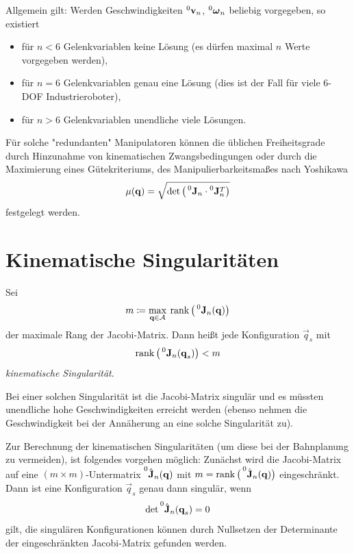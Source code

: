 		Allgemein gilt: Werden Geschwindigkeiten \( \prescript{0}{}{\boldsymbol{\mathrm{v}}}_n \), \( \prescript{0}{}{\boldsymbol{\mathrm{\omega}}}_n \) beliebig vorgegeben, so existiert
		\begin{itemize}
			\item für \( n < 6 \) Gelenkvariablen \iA keine Lösung (es dürfen maximal \(n\) Werte vorgegeben werden),
			\item für \( n = 6 \) Gelenkvariablen \iA genau eine Lösung (dies ist der Fall für viele \num{6}-DOF Industrieroboter),
			\item für \( n > 6 \) Gelenkvariablen \iA unendliche viele Lösungen.
		\end{itemize}
		Für solche "redundanten" Manipulatoren können die üblichen Freiheitsgrade \zB durch Hinzunahme von kinematischen Zwangsbedingungen oder durch die Maximierung eines Gütekriteriums, \zB des Manipulierbarkeitsmaßes nach Yoshikawa
		\begin{equation*}
			\mu(\boldsymbol{\mathrm{q}}) = \sqrt{\det \big( \prescript{0}{}{\boldsymbol{\mathrm{J}}}_n \cdot \prescript{0}{}{\boldsymbol{\mathrm{J}}}_n^T \big)}
		\end{equation*}
		festgelegt werden.

	\section{Kinematische Singularitäten}
		Sei
		\begin{equation*}
			m \coloneqq \max_{\boldsymbol{\mathrm{q}} \in \mathcal{A}} \> \rank\big(\prescript{0}{}{\boldsymbol{\mathrm{J}}}_n(\boldsymbol{\mathrm{q}})\big)
		\end{equation*}
		der maximale Rang der Jacobi-Matrix. Dann heißt jede Konfiguration \(\vec{q}_s\) mit
		\begin{equation*}
			\rank\big(\prescript{0}{}{\boldsymbol{\mathrm{J}}}_n(\boldsymbol{\mathrm{q}}_s)\big) < m
		\end{equation*}
		\emph{kinematische Singularität}.
		
		Bei einer solchen Singularität ist die Jacobi-Matrix singulär und es müssten unendliche hohe Geschwindigkeiten erreicht werden (ebenso nehmen die Geschwindigkeit bei der Annäherung an eine solche Singularität \iA zu).
		
		Zur Berechnung der kinematischen Singularitäten (\zB um diese bei der Bahnplanung zu vermeiden), ist folgendes vorgehen möglich: Zunächst wird die Jacobi-Matrix auf eine \( (m \times m) \)-Untermatrix \( \prescript{0}{}{\hat{\boldsymbol{\mathrm{J}}}}_n(\boldsymbol{\mathrm{q}}) \) mit \( m = \rank\big(\prescript{0}{}{\hat{\boldsymbol{\mathrm{J}}}}_n(\boldsymbol{\mathrm{q}})\big) \) eingeschränkt. Dann ist eine Konfiguration \(\vec{q}_s\) genau dann singulär, wenn
		\begin{equation*}
			\det \prescript{0}{}{\hat{\boldsymbol{\mathrm{J}}}}_n(\boldsymbol{\mathrm{q}}_s) = 0
		\end{equation*}
		gilt, \dh die singulären Konfigurationen können durch Nullsetzen der Determinante der eingeschränkten Jacobi-Matrix gefunden werden.

